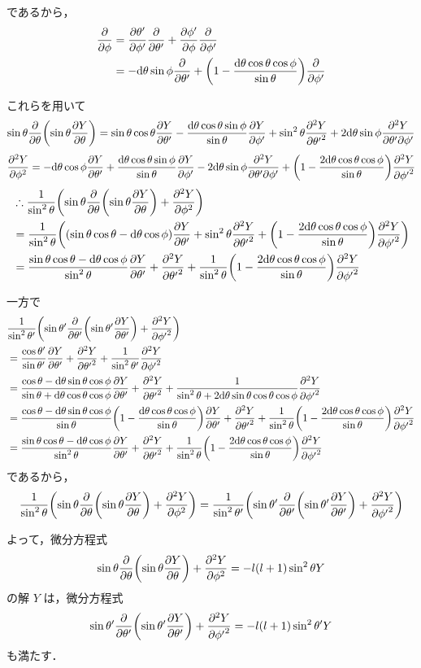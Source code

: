 \documentclass[uplatex]{jsarticle}
\begin{document}
であるから，
\begin{align*}
	\pdv{\phi}
	&= \pdv{\theta'}{\phi'} \pdv{\theta'} + \pdv{\phi'}{\phi} \pdv{\phi'} \\
	&= -\dd\theta\sin\phi\pdv{\theta'} + \biggl(1 - \frac{\dd\theta\cos\theta\cos\phi}{\sin\theta}\biggr) \pdv{\phi'}
\end{align*}

これらを用いて
\[
	\sin\theta\pdv{\theta}\biggl(\sin\theta\pdv{Y}{\theta}\biggr)
	= \sin\theta\cos\theta\pdv{Y}{\theta'}
	- \frac{\dd\theta\cos\theta\sin\phi}{\sin\theta}\pdv{Y}{\phi'}
	+ \sin^2\theta\pdv[2]{Y}{{\theta'}}
	+ 2\dd\theta\sin\phi\pdv{Y}{\theta'}{\phi'}
\] \[
	\pdv[2]{Y}{\phi}
	= -\dd\theta\cos\phi\pdv{Y}{\theta'}
	+ \frac{\dd\theta\cos\theta\sin\phi}{\sin\theta}\pdv{Y}{\phi'}
	- 2\dd\theta\sin\phi\pdv{Y}{\theta'}{\phi'}
	+ \biggl(1 - \frac{2\dd\theta\cos\theta\cos\phi}{\sin\theta}\biggr)\pdv[2]{Y}{{\phi'}}
\]
\begin{align*}
	& \therefore \frac{1}{\sin^2\theta}\biggl(\sin\theta\pdv{\theta}\biggl(\sin\theta\pdv{Y}{\theta}\biggr) + \pdv[2]{Y}{\phi}\biggr) \\
	&= \frac{1}{\sin^2\theta} \biggl(
	(\sin\theta\cos\theta - \dd\theta\cos\phi) \pdv{Y}{\theta'}
	+ \sin^2\theta \pdv[2]{Y}{{\theta'}}
	+ \biggl(1 - \frac{2\dd\theta\cos\theta\cos\phi}{\sin\theta}\biggr)\pdv[2]{Y}{{\phi'}}
	\biggr) \\
	&= \frac{\sin\theta\cos\theta - \dd\theta\cos\phi}{\sin^2\theta}\pdv{Y}{\theta'}
	+ \pdv[2]{Y}{{\theta'}}
	+ \frac{1}{\sin^2\theta}\biggl(1 - \frac{2\dd\theta\cos\theta\cos\phi}{\sin\theta}\biggr)\pdv[2]{Y}{{\phi'}}
\end{align*}

一方で
\begin{align*}
	& \frac{1}{\sin^2\theta'} \biggl( \sin\theta'\pdv{\theta'}\biggl(\sin\theta'\pdv{Y}{\theta'}\biggr) + \pdv[2]{Y}{{\phi'}} \biggr) \\
	&= \frac{\cos\theta'}{\sin\theta'}\pdv{Y}{\theta'} + \pdv[2]{Y}{{\theta'}} + \frac{1}{\sin^2\theta'} \pdv[2]{Y}{{\phi'}} \\
	&= \frac{\cos\theta - \dd\theta\sin\theta\cos\phi}{\sin\theta + \dd\theta\cos\theta\cos\phi} \pdv{Y}{\theta'}
	+ \pdv[2]{Y}{{\theta'}} + \frac{1}{\sin^2\theta + 2\dd\theta\sin\theta\cos\theta\cos\phi}\pdv[2]{Y}{{\phi'}} \\
	&= \frac{\cos\theta - \dd\theta\sin\theta\cos\phi}{\sin\theta}\biggl(1 - \frac{\dd\theta\cos\theta\cos\phi}{\sin\theta}\biggr) \pdv{Y}{\theta'}
	+ \pdv[2]{Y}{{\theta'}} + \frac{1}{\sin^2\theta} \biggl(1 - \frac{2\dd\theta\cos\theta\cos\phi}{\sin\theta}\biggr) \pdv[2]{Y}{{\phi'}} \\
	&= \frac{\sin\theta\cos\theta - \dd\theta\cos\phi}{\sin^2\theta} \pdv{Y}{\theta'}
	+ \pdv[2]{Y}{{\theta'}} + \frac{1}{\sin^2\theta} \biggl(1 - \frac{2\dd\theta\cos\theta\cos\phi}{\sin\theta}\biggr) \pdv[2]{Y}{{\phi'}} \\
\end{align*}
であるから，
\[
	\frac{1}{\sin^2\theta}\biggl(\sin\theta\pdv{\theta}\biggl(\sin\theta\pdv{Y}{\theta}\biggr) + \pdv[2]{Y}{\phi}\biggr)
	= \frac{1}{\sin^2\theta'} \biggl( \sin\theta'\pdv{\theta'}\biggl(\sin\theta'\pdv{Y}{\theta'}\biggr) + \pdv[2]{Y}{{\phi'}} \biggr)
\]

よって，微分方程式
\[ \sin\theta\pdv{\theta}\biggl(\sin\theta\pdv{Y}{\theta}\biggr) + \pdv[2]{Y}{\phi} = -l(l + 1)\sin^2\theta Y \]
の解 $ Y $ は，微分方程式
\[ \sin\theta'\pdv{\theta'}\biggl(\sin\theta'\pdv{Y}{\theta'}\biggr) + \pdv[2]{Y}{{\phi'}} = -l(l + 1)\sin^2\theta' Y \]
も満たす．
\end{document}
